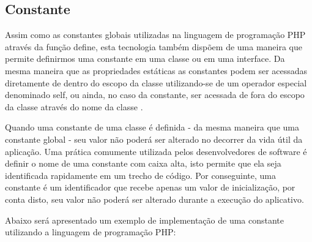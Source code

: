 \subsection{Constante}

Assim como as constantes globais utilizadas na linguagem de programação PHP
através da função define, esta tecnologia também dispõem de uma maneira que
permite definirmos uma constante em uma classe ou em uma interface. Da mesma
maneira que as propriedades estáticas as constantes podem ser acessadas
diretamente de dentro do escopo da classe utilizando-se de um operador especial
denominado self, ou ainda, no caso da constante, ser acessada de fora do escopo
da classe através do nome da classe  \cite{programmingPhp}.

Quando uma constante de uma classe é definida - da mesma maneira que uma
constante global -  seu valor não poderá ser alterado no decorrer da vida útil
da aplicação. Uma prática comumente utilizada pelos desenvolvedores de software
é definir o nome de uma constante com caixa alta, isto permite que ela seja
identificada rapidamente em um trecho de código. Por conseguinte, uma constante
é um identificador que recebe apenas um valor de inicialização, por conta disto,
seu valor não poderá ser alterado durante a execução do aplicativo.

Abaixo será apresentado um exemplo de implementação de uma constante utilizando
a linguagem de programação PHP: